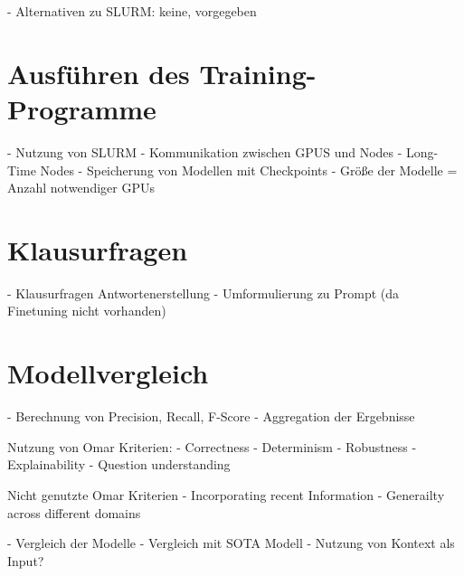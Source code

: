 - Alternativen zu SLURM: keine, vorgegeben

\section{Ausführen des Training-Programme}
- Nutzung von SLURM
- Kommunikation zwischen GPUS und Nodes
- Long-Time Nodes
- Speicherung von Modellen mit Checkpoints
- Größe der Modelle = Anzahl notwendiger GPUs

\section{Klausurfragen}
- Klausurfragen Antwortenerstellung
- Umformulierung zu Prompt (da Finetuning nicht vorhanden)

\section{Modellvergleich}
- Berechnung von Precision, Recall, F-Score
- Aggregation der Ergebnisse

Nutzung von Omar Kriterien:
    - Correctness
    - Determinism
    - Robustness
    - Explainability
    - Question understanding

Nicht genutzte Omar Kriterien
    - Incorporating recent Information
    - Generailty across different domains
    
- Vergleich der Modelle
- Vergleich mit SOTA Modell
    - Nutzung von Kontext als Input?

